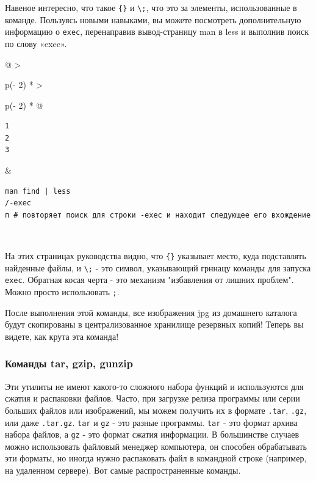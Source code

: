 \documentclass{report}
\begin{document}
Навеное интересно, что такое
\texttt{\textquotesingle{}\{\}\textquotesingle{}} и
\texttt{\textbackslash{};}, что это за элементы, использованные в
команде. Пользуясь новыми навыками, вы можете посмотреть дополнительную
информацию о \texttt{exec}, перенаправив вывод-страницу man в less и
выполнив поиск по слову «exec».

\begin{longtable}[]{@{}
  >{\raggedright\arraybackslash}p{(\columnwidth - 2\tabcolsep) * }
  >{\raggedright\arraybackslash}p{(\columnwidth - 2\tabcolsep) * }@{}}
\toprule
\endhead
\begin{minipage}[t]{\linewidth}\raggedright
\begin{verbatim}
1
2
3
\end{verbatim}
\end{minipage} & \begin{minipage}[t]{\linewidth}\raggedright
\begin{verbatim}
man find | less
/-exec
п # повторяет поиск для строки -exec и находит следующее его вхождение
\end{verbatim}
\end{minipage} \\ \addlinespace
\bottomrule
\end{longtable}

На этих страницах руководства видно, что
\texttt{\textquotesingle{}\{\}\textquotesingle{}} указывает место, куда
подставлять найденные файлы, и \texttt{\textbackslash{};} - это символ,
указывающий грннацу команды для запуска \texttt{exec}. Обратная косая
черта - это механизм "избавления от лишних проблем". Можно просто
использовать \texttt{\textquotesingle{};\textquotesingle{}}.

После выполнения этой команды, все изображения jpg из домашнего каталога
будут скопированы в централизованное хранилище резервных копий! Теперь
вы видете, как крута эта команда!

\hypertarget{tar-gzip-gunzip}{%
\subsubsection{\texorpdfstring{\protect\hyperlink{tar-gzip-gunzip}{}Команды
tar, gzip, gunzip}{Команды tar, gzip, gunzip}}\label{tar-gzip-gunzip}}

Эти утилиты не имеют какого-то сложного набора функций и используются
для сжатия и распаковки файлов. Часто, при загрузке релиза программы или
серии больших файлов или изображений, мы можем получить их в формате
\texttt{.tar}, \texttt{.gz}, или даже \texttt{.tar.gz}. \texttt{tar} и
\texttt{gz} - это разные программы. \texttt{tar} - это формат архива
набора файлов, а \texttt{gz} - это формат сжатия информации. В
большинстве случаев можно использовать файловый менеджер компьютера, он
способен обрабатывать эти форматы, но иногда нужно распаковать файл в
командной строке (например, на удаленном сервере). Вот самые
распространенные команды.
\end{document}
